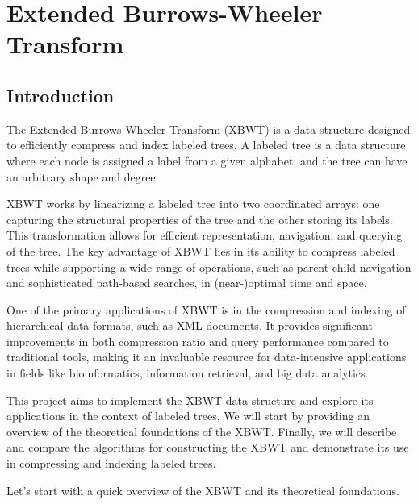 \chapter{Extended Burrows-Wheeler Transform}
\section{Introduction} 

The Extended Burrows-Wheeler Transform (XBWT) is a data structure designed to efficiently compress and index labeled trees. A labeled tree is a data structure where each node is assigned a label from a given alphabet, and the tree can have an arbitrary shape and degree.

XBWT works by linearizing a labeled tree into two coordinated arrays: one capturing the structural properties of the tree and the other storing its labels. This transformation allows for efficient representation, navigation, and querying of the tree. The key advantage of XBWT lies in its ability to compress labeled trees while supporting a wide range of operations, such as parent-child navigation and sophisticated path-based searches, in (near-)optimal time and space.

One of the primary applications of XBWT is in the compression and indexing of hierarchical data formats, such as XML documents. It provides significant improvements in both compression ratio and query performance compared to traditional tools, making it an invaluable resource for data-intensive applications in fields like bioinformatics, information retrieval, and big data analytics.

This project aims to implement the XBWT data structure and explore its applications in the context of labeled trees. We will start by providing an overview of the theoretical foundations of the XBWT. Finally, we will describe and compare the algorithms for constructing the XBWT and demonstrate its use in compressing and indexing labeled trees.

Let's start with a quick overview of the XBWT and its theoretical foundations.


